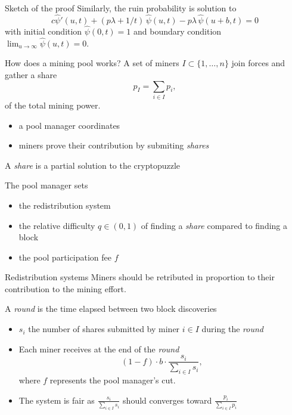 \documentclass{beamer}
\begin{document}
\begin{frame}[allowframebreaks]{Sketch of the proof}
Similarly, the ruin probability is solution to 
\begin{equation*}\label{psii}
c\widehat{\psi}'(u,t)+(p \lambda+1/t)\,\widehat{\psi}(u,t)-p \lambda\,\widehat{\psi}(u+b,t)=0
\end{equation*}
with initial condition $\widehat{\psi}(0,t)=1$ and boundary condition $\lim_{u\to\infty}\widehat{\psi}(u,t)=0$.
\end{frame}
\begin{frame}{How does a mining pool works?}
\scriptsize
A set of miners $I\subset\{1,\ldots, n\}$ join forces and gather a share 
$$
p_I = \sum_{i\in I }p_i,
$$
of the total mining power. 
\begin{itemize}
  \item a pool manager coordinates
  \item miners prove their contribution by submiting \textit{shares}  
\end{itemize}
\begin{tcolorbox}[enhanced,drop shadow, title=Definition (share)]
A \textit{share} is a partial solution to the cryptopuzzle
\end{tcolorbox}
The pool manager sets
\begin{itemize} 
  \item the redistribution system
  \item the relative difficulty $q\in(0,1)$ of finding a \textit{share} compared to finding a block
  \item the pool participation fee $f$
  \end{itemize} 
\end{frame}
\begin{frame}{Redistribution systems}
\scriptsize
Miners should be retributed in proportion to their contribution to the mining effort. 
\begin{tcolorbox}[enhanced,drop shadow, title=Proportional reward system]
A \textit{round} is the time elapsed between two block discoveries
\begin{itemize} 
  \item $s_i$ the number of shares submitted by miner $i\in I$ during the \textit{round}
  \item Each miner receives at the end of the \textit{round}
  $$
  (1-f)\cdot b\cdot\frac{s_i}{\sum_{i\in I}s_i},
  $$
  where $f$ represents the pool manager's cut.
  \item The system is fair as $\frac{s_i}{\sum_{i\in I}s_i}$ should converges toward $\frac{p_i}{\sum_{i\in I}p_i}$
\end{itemize}

\end{tcolorbox}
\end{frame}
\end{document}
